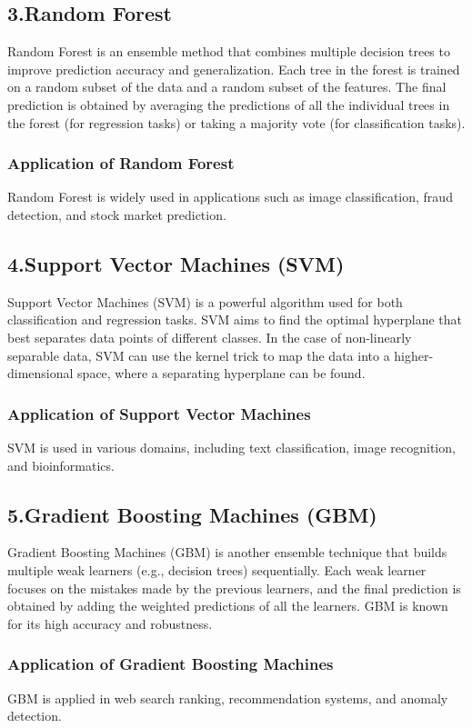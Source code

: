 \documentclass{article}
\begin{document}
\subsection{3.Random Forest}
Random Forest is an ensemble method that combines multiple decision trees to improve prediction accuracy and generalization. Each tree in the forest is trained on a random subset of the data and a random subset of the features. The final prediction is obtained by averaging the predictions of all the individual trees in the forest (for regression tasks) or taking a majority vote (for classification tasks).

\subsubsection{Application of Random Forest}
Random Forest is widely used in applications such as image classification, fraud detection, and stock market prediction.

\subsection{4.Support Vector Machines (SVM)}
Support Vector Machines (SVM) is a powerful algorithm used for both classification and regression tasks. SVM aims to find the optimal hyperplane that best separates data points of different classes. In the case of non-linearly separable data, SVM can use the kernel trick to map the data into a higher-dimensional space, where a separating hyperplane can be found.

\subsubsection{Application of Support Vector Machines}
SVM is used in various domains, including text classification, image recognition, and bioinformatics.

\subsection{5.Gradient Boosting Machines (GBM)}
Gradient Boosting Machines (GBM) is another ensemble technique that builds multiple weak learners (e.g., decision trees) sequentially. Each weak learner focuses on the mistakes made by the previous learners, and the final prediction is obtained by adding the weighted predictions of all the learners. GBM is known for its high accuracy and robustness.

\subsubsection{Application of Gradient Boosting Machines}
GBM is applied in web search ranking, recommendation systems, and anomaly detection.
\end{document}
